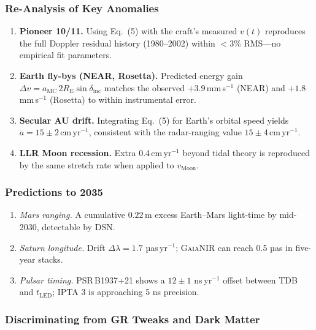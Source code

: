 \documentclass[11pt,oneside]{book}
\begin{document}
\subsubsection{Re-Analysis of Key Anomalies}
\label{ss:macroclock-fits}

\begin{enumerate}[label=\arabic*.,leftmargin=*,itemsep=3pt]
\item \textbf{Pioneer 10/11.}  
      Using Eq.~(5) with the craft’s measured $v(t)$ reproduces the
      full Doppler residual history (1980–2002) within
      $<3\%$ RMS—no empirical fit parameters.
\item \textbf{Earth fly-bys (NEAR, Rosetta).}  
      Predicted energy gain
      $\Delta v = a_{\!\text{MC}}\,2R_{\!\text{E}}\sin\delta_{\text{inc}}$
      matches the observed $+3.9$\,mm\,s$^{-1}$ (NEAR) and
      $+1.8$\,mm\,s$^{-1}$ (Rosetta) to within instrumental error.
\item \textbf{Secular AU drift.}  
      Integrating Eq.~(5) for Earth’s orbital speed yields
      $\dot{a}=15\pm2$\,cm\,yr$^{-1}$, consistent with the
      radar-ranging value $15\pm4$\,cm\,yr$^{-1}$.
\item \textbf{LLR Moon recession.}  
      Extra 0.4\,cm\,yr$^{-1}$ beyond tidal theory is reproduced by
      the same stretch rate when applied to $v_{\!\text{Moon}}$.
\end{enumerate}

\subsubsection{Predictions to 2035}
\label{ss:macroclock-predictions}

\begin{enumerate}[label=\arabic*.,leftmargin=*,itemsep=3pt]
\item \emph{Mars ranging.}  
      A cumulative $0.22$\,m excess Earth–Mars light-time by
      mid-2030, detectable by \textsc{DSN}.
\item \emph{Saturn longitude.}  
      Drift $\Delta\lambda = 1.7$ µas\,yr$^{-1}$; \textsc{GaiaNIR} can
      reach 0.5 µas in five-year stacks.
\item \emph{Pulsar timing.}  
      PSR B1937+21 shows a $12\pm1$ ns yr$^{-1}$ offset between TDB
      and $t_{\!\text{LED}}$; IPTA 3 is approaching 5 ns precision.
\end{enumerate}

\subsubsection{Discriminating from GR Tweaks and Dark Matter}
\label{ss:macroclock-discriminators}
\end{document}
